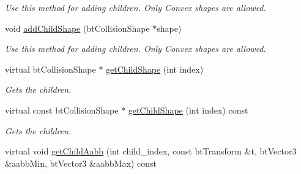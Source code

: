 \begin{CompactItemize}
\begin{CompactList}\small\item\em Use this method for adding children. Only Convex shapes are allowed. \item\end{CompactList}\item 
\hypertarget{classbt_g_impact_compound_shape_106e3d9999c847a9748c962378ab3f46}{
void \hyperlink{classbt_g_impact_compound_shape_106e3d9999c847a9748c962378ab3f46}{addChildShape} (btCollisionShape $\ast$shape)}
\label{classbt_g_impact_compound_shape_106e3d9999c847a9748c962378ab3f46}

\begin{CompactList}\small\item\em Use this method for adding children. Only Convex shapes are allowed. \item\end{CompactList}\item 
\hypertarget{classbt_g_impact_compound_shape_91310884e33cfa7dc25d803ffb577ac0}{
virtual btCollisionShape $\ast$ \hyperlink{classbt_g_impact_compound_shape_91310884e33cfa7dc25d803ffb577ac0}{getChildShape} (int index)}
\label{classbt_g_impact_compound_shape_91310884e33cfa7dc25d803ffb577ac0}

\begin{CompactList}\small\item\em Gets the children. \item\end{CompactList}\item 
\hypertarget{classbt_g_impact_compound_shape_d4edd755e27e6ff3fdf99b9bc811c749}{
virtual const btCollisionShape $\ast$ \hyperlink{classbt_g_impact_compound_shape_d4edd755e27e6ff3fdf99b9bc811c749}{getChildShape} (int index) const }
\label{classbt_g_impact_compound_shape_d4edd755e27e6ff3fdf99b9bc811c749}

\begin{CompactList}\small\item\em Gets the children. \item\end{CompactList}\item 
\hypertarget{classbt_g_impact_compound_shape_9f43948dab925a6e75cd6062d084c27e}{
virtual void \hyperlink{classbt_g_impact_compound_shape_9f43948dab925a6e75cd6062d084c27e}{getChildAabb} (int child\_\-index, const btTransform \&t, btVector3 \&aabbMin, btVector3 \&aabbMax) const }
\label{classbt_g_impact_compound_shape_9f43948dab925a6e75cd6062d084c27e}


\end{CompactItemize}
